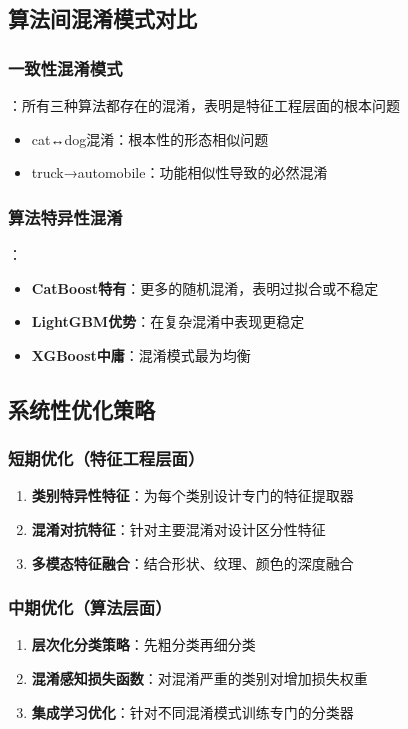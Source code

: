 \documentclass[UTF8]{report}
\theoremstyle{MyLineTheoremStyle} %
\theoremstyle{MyBlockTheoremStyle} %
\theoremstyle{MySubsubsectionStyle} %
\begin{document}
\subsection{算法间混淆模式对比}
\subsubsection{一致性混淆模式}：所有三种算法都存在的混淆，表明是特征工程层面的根本问题
\begin{itemize}
    \item cat↔dog混淆：根本性的形态相似问题
    \item truck→automobile：功能相似性导致的必然混淆
\end{itemize}
\subsubsection{算法特异性混淆}：
\begin{itemize}
    \item \textbf{CatBoost特有}：更多的随机混淆，表明过拟合或不稳定
    \item \textbf{LightGBM优势}：在复杂混淆中表现更稳定
    \item \textbf{XGBoost中庸}：混淆模式最为均衡
\end{itemize}

\subsection{系统性优化策略}
\subsubsection{短期优化（特征工程层面）}
\begin{enumerate}
    \item \textbf{类别特异性特征}：为每个类别设计专门的特征提取器
    \item \textbf{混淆对抗特征}：针对主要混淆对设计区分性特征
    \item \textbf{多模态特征融合}：结合形状、纹理、颜色的深度融合
\end{enumerate}
\subsubsection{中期优化（算法层面）}
\begin{enumerate}
    \item \textbf{层次化分类策略}：先粗分类再细分类
    \item \textbf{混淆感知损失函数}：对混淆严重的类别对增加损失权重
    \item \textbf{集成学习优化}：针对不同混淆模式训练专门的分类器
\end{enumerate}
\end{document}
